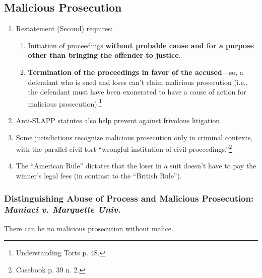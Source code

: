 \subsection{Malicious Prosecution}

\begin{enumerate}
    \item Restatement (Second) requires:
    \begin{enumerate}
        \item Initiation of proceedings \textbf{without probable cause and for 
        a purpose other than bringing the offender to justice}.
        \item \textbf{Termination of the proceedings in favor of the 
        accused}---so, a defendant who is sued and loses can't claim malicious 
        prosecution (i.e., the defendant must have been exonerated to have a 
        cause of action for malicious prosecution).\footnote{Understanding 
        Torts p. 48.}
    \end{enumerate}
    \item Anti-SLAPP statutes also help prevent against frivolous litigation.
    \item Some jurisdictions recognize malicious prosecution only in criminal 
    contexts, with the parallel civil tort ``wrongful institution of civil 
    proceedings.''\footnote{Casebook p. 39 n. 2.}
    \item The ``American Rule'' dictates that the loser in a suit doesn't have 
    to pay the winner's legal fees (in contrast to the ``British Rule'').
\end{enumerate}

\subsubsection{Distinguishing Abuse of Process and Malicious Prosecution: 
\emph{Maniaci v. Marquette Univ.}}

There can be no malicious prosecution without malice.

